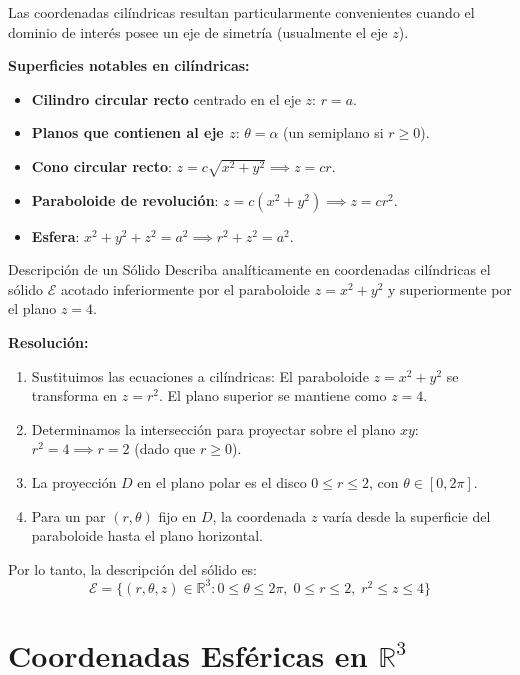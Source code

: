 \documentclass[11pt,a4paper]{article}
\begin{document}
Las coordenadas cilíndricas resultan particularmente convenientes cuando el dominio de interés posee un eje de simetría (usualmente el eje $z$).

\textbf{Superficies notables en cilíndricas:}
\begin{itemize}
    \item \textbf{Cilindro circular recto} centrado en el eje $z$: $r = a$.
    \item \textbf{Planos que contienen al eje $z$}: $\theta = \alpha$ (un semiplano si $r \geq 0$).
    \item \textbf{Cono circular recto}: $z = c \sqrt{x^2+y^2} \implies z = cr$.
    \item \textbf{Paraboloide de revolución}: $z = c(x^2+y^2) \implies z = c r^2$.
    \item \textbf{Esfera}: $x^2+y^2+z^2 = a^2 \implies r^2 + z^2 = a^2$.
\end{itemize}

\begin{ejerciciobox}{Descripción de un Sólido}
Describa analíticamente en coordenadas cilíndricas el sólido $\mathcal{E}$ acotado inferiormente por el paraboloide $z = x^2 + y^2$ y superiormente por el plano $z = 4$.

\textbf{Resolución:}
\begin{enumerate}
    \item Sustituimos las ecuaciones a cilíndricas:
          El paraboloide $z = x^2 + y^2$ se transforma en $z = r^2$.
          El plano superior se mantiene como $z = 4$.
    \item Determinamos la intersección para proyectar sobre el plano $xy$:
          $r^2 = 4 \implies r = 2$ (dado que $r \geq 0$).
    \item La proyección $D$ en el plano polar es el disco $0 \leq r \leq 2$, con $\theta \in [0, 2\pi]$.
    \item Para un par $(r, \theta)$ fijo en $D$, la coordenada $z$ varía desde la superficie del paraboloide hasta el plano horizontal.
\end{enumerate}
Por lo tanto, la descripción del sólido es:
\[ \mathcal{E} = \{ (r, \theta, z) \in \mathbb{R}^3 : 0 \leq \theta \leq 2\pi, \; 0 \leq r \leq 2, \; r^2 \leq z \leq 4 \} \]
\end{ejerciciobox}

\section{Coordenadas Esféricas en $\mathbb{R}^3$}
\end{document}
